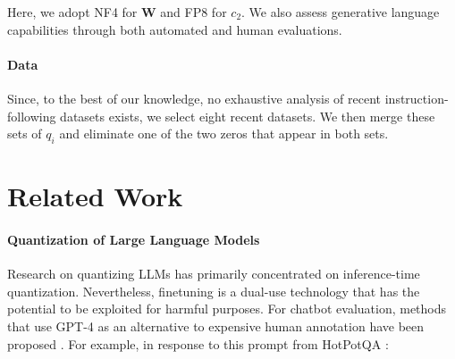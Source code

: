 Here, we adopt NF4 for $\mathbf{W}$ and FP8 for $c_2$. We also assess generative language capabilities through both automated and human evaluations. \paragraph{Data} Since, to the best of our knowledge, no exhaustive analysis of recent instruction-following datasets exists, we select eight recent datasets. We then merge these sets of $q_i$ and eliminate one of the two zeros that appear in both sets. \section{Related Work}

\paragraph{Quantization of Large Language Models} Research on quantizing LLMs has primarily concentrated on inference-time quantization. Nevertheless, finetuning is a dual-use technology that has the potential to be exploited for harmful purposes. For chatbot evaluation, methods that use GPT-4 as an alternative to expensive human annotation have been proposed \citep{vicuna2023,peng2023instruction}. For example, in response to this prompt from HotPotQA \citep{yang2018hotpotqa}:

